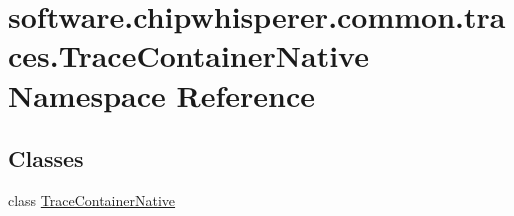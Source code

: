\hypertarget{namespacesoftware_1_1chipwhisperer_1_1common_1_1traces_1_1TraceContainerNative}{}\section{software.\+chipwhisperer.\+common.\+traces.\+Trace\+Container\+Native Namespace Reference}
\label{namespacesoftware_1_1chipwhisperer_1_1common_1_1traces_1_1TraceContainerNative}
\subsection*{Classes}
\begin{DoxyCompactItemize}
\item 
class \hyperlink{classsoftware_1_1chipwhisperer_1_1common_1_1traces_1_1TraceContainerNative_1_1TraceContainerNative}{Trace\+Container\+Native}
\end{DoxyCompactItemize}
